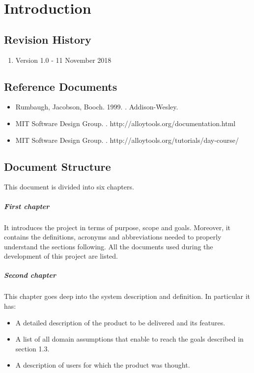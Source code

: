 \documentclass[../rasd.tex]{subfiles}
\begin{document}
\chapter{Introduction}
\thispagestyle{fancy}
		
		
		
		
		
	
		\section{Revision History}
		\begin{enumerate}
			\item Version 1.0 - 11 November 2018
		\end{enumerate}
		\section{Reference Documents}
			\begin{itemize}
				\item Rumbaugh, Jacobson, Booch. 1999. . Addison-Wesley.
				\item MIT Software Design Group. . http://alloytools.org/documentation.html
				\item MIT Software Design Group. . http://alloytools.org/tutorials/day-course/
			\end{itemize}
		\section{Document Structure}
		This document is divided into six chapters.
		\paragraph{First chapter}
		It introduces the project in terms of purpose, scope and goals. Moreover, it contains the definitions, acronyms and abbreviations needed to properly understand the sections following. All the documents used during the development of this project are listed.
		\paragraph{Second chapter}
		This chapter goes deep into the system description and definition. In particular it has:
		\begin{itemize}
			\item A detailed description of the product to be delivered and its features.
			\item A list of all domain assumptions that enable to reach the goals described in section 1.3.
			\item A description of users for which the product was thought.
		\end{itemize}
\end{document}
